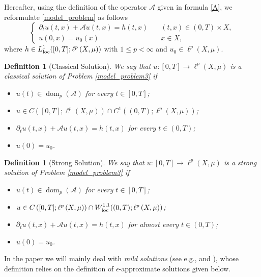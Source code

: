 \documentclass[journal]{article}
\theoremstyle{nonitalic}
\theoremstyle{nonitalic}
\theoremstyle{plain} %
\newtheorem{definition}[theorem]{Definition}
\numberwithin{equation}{section}
\newcommand{\dom}{\operatorname{dom}}
\begin{document}
Hereafter, using the definition of the operator $\mathcal A$ given in formula \eqref{A}, we reformulate \ref{model_problem} as follows
\begin{equation}\label{model_problem3}
	\begin{cases}
		\partial_t u(t,x) + \mathcal{A} u(t,x) = h(t,x)  &  \quad (t,x) \in (0,T)\times X,\\
		u(0,x) = u_0(x) & \quad x \in X,
	\end{cases}
\end{equation}
where $h \in L^1_{\rm{loc}}([0,T] ; \ell^p\left(X,\mu\right))$ with $1\leq p <\infty$ and $u_0 \in {\ell^p(X,\mu)}$. 
\begin{definition}[Classical  Solution]\label{def:classical_solution}
	We say that $u \colon [0,T] \to \ell^p\left(X,\mu\right)$ is a \emph{classical solution} of Problem \eqref{model_problem3} if
	\begin{itemize}
		\item $u(t) \in {\dom_p(\mathcal{A})}$ for every $t \in [0,T]$;
		\item $u \in C\left( [0,T]; \ell^p\left(X,\mu\right)\right)\cap C^1\left( (0,T); \ell^p\left(X,\mu\right)\right)$;
		\item $\partial_t u(t,x) + \mathcal{A} u(t,x) = h(t,x) $ for every $t\in (0,T)$;
		\item $u(0)=u_0$.
	\end{itemize}
\end{definition}

\begin{definition}[Strong Solution]\label{def:strong_solution}
	We say that  $u \colon [0,T] \to \ell^p\left(X,\mu\right)$  is a \emph{strong solution} of Problem \eqref{model_problem3} if
	\begin{itemize}
		\item $u(t) \in {\dom_p(\mathcal{A})}$ for every $t \in [0,T]$;
		\item $u \in C\left([0,T]; \ell^p\left(X,\mu\right)\right)\cap W^{1,1}_{\textnormal{loc}}((0,T);\ell^p\left(X,\mu\right))$;
		\item $\partial_t u(t,x) + \mathcal{A} u(t,x) = h(t,x) $ for almost every $t\in (0,T)$;
		\item $u(0)=u_0$.
	\end{itemize}
\end{definition}

In the paper we will mainly deal with \emph{mild solutions} (see e.g., \cite{barbu2010nonlinear} and \cite{benilan1988evolution}), whose definition relies on the definition of $\epsilon$-approximate solutions given below.
\end{document}
